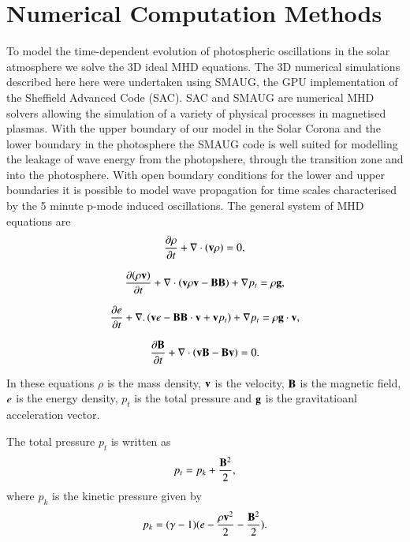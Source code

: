 \documentclass[final,1p]{elsarticle}
\begin{document}
\section{Numerical Computation Methods}
To model the time-dependent evolution of photospheric oscillations in the solar atmosphere  we solve the 3D ideal MHD equations.   The 3D numerical simulations described here here were undertaken using SMAUG, the GPU implementation of the Sheffield Advanced Code (SAC)\cite{Griffiths2015}\cite{Shelyag2008}. SAC and SMAUG are numerical MHD solvers allowing the simulation of a variety of physical processes in magnetised plasmas.  With the upper boundary of our model in the Solar Corona and the lower boundary in the photosphere the SMAUG code is well suited for modelling the leakage of wave energy from the photopshere, through the transition zone and into the photosphere. With open boundary conditions for the lower and upper boundaries it is possible to model wave propagation for time scales characterised by the 5 minute p-mode induced oscillations. The general system of MHD equations are
\begin{equation}\label{eqdens}
{{\partial \rho}\over{\partial t}}+\nabla\cdot\left( {\bf v}\rho\right)=0,
\end{equation}

\begin{equation}\label{eqmom}
{{\partial ( \rho {\bf v})}\over{\partial t}}+\nabla\cdot\left( {\bf v}\rho {\bf v}-{\bf B B}\right)+\nabla p_t=\rho{\bf g},
\end{equation}

\begin{equation}\label{eqe}
{{\partial e}\over{\partial t}}+\nabla.\left({\bf v}e-{\bf B B}\cdot{\bf v}+{\bf v}p_{t}\right)+\nabla p_t=\rho{\bf g}\cdot{\bf v},
\end{equation}

\begin{equation}\label{eqb}
{{\partial{\bf B}}\over{\partial t}} +\nabla \cdot\left(  {\bf vB}-{\bf Bv}\right)=0.
\end{equation}

In these equations $\rho$ is the mass density, $  \bf { v} $ is the velocity,   $ \bf B$ is the magnetic field, $\it{e}$ is the energy density, $p_{t}$ is the total pressure and $\bf g$ is the gravitatioanl acceleration vector.

The total pressure $p_{t}$ is written as
\begin{equation}\label{eqpt}
p_{t}=p_{k}+{{\bf B}^{2}\over{2}},
\end{equation}
where $p_k$ is the kinetic pressure given by
\begin{equation}\label{eqpk}
p_{k}=(\gamma - 1)( e-{{\rho \bf v }^{2}\over{2}}-  {{\bf B}^{2}\over{2}} ).
\end{equation}
\end{document}
